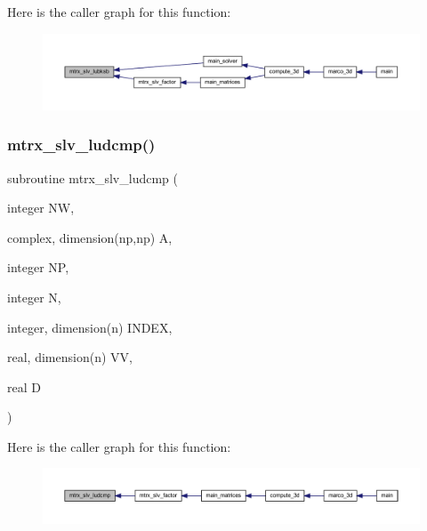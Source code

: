 Here is the caller graph for this function\+:
\nopagebreak
\begin{figure}[H]
\begin{center}
\leavevmode
\includegraphics[width=350pt]{Marco_8f90_a12480a5c6798dd29e9fb9b68f16c280b_icgraph}
\end{center}
\end{figure}
\mbox{\label{Marco_8f90_ae7592ac4876eb1c027e45dbaecddd29d}} 
\subsubsection{\texorpdfstring{mtrx\+\_\+slv\+\_\+ludcmp()}{mtrx\_slv\_ludcmp()}}
{\footnotesize\ttfamily subroutine mtrx\+\_\+slv\+\_\+ludcmp (\begin{DoxyParamCaption}\item[{integer}]{NW,  }\item[{complex, dimension(np,np)}]{A,  }\item[{integer}]{NP,  }\item[{integer}]{N,  }\item[{integer, dimension(n)}]{I\+N\+D\+EX,  }\item[{real, dimension(n)}]{VV,  }\item[{real}]{D }\end{DoxyParamCaption})}

Here is the caller graph for this function\+:
\nopagebreak
\begin{figure}[H]
\begin{center}
\leavevmode
\includegraphics[width=350pt]{Marco_8f90_ae7592ac4876eb1c027e45dbaecddd29d_icgraph}
\end{center}
\end{figure}
\mbox{\label{Marco_8f90_a3087d74c0491a5f5b127e78d96b7df0c}} 
